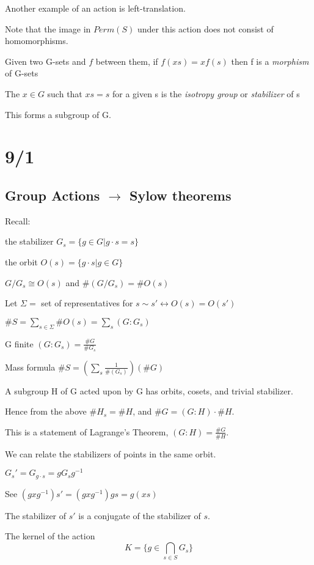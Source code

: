 \documentclass[12pt]{article}
\begin{document}
\noindent
Another example of an action is left-translation.

Note that the image in $Perm(S)$ under this action does not consist of homomorphisms.

\noindent
Given two G-sets and $f$ between them, if $f(xs) = xf(s)$ then f is a \textit{morphism} of G-sets

\noindent
The $x \in G$ such that $xs = s$ for a given s is the \textit{isotropy group} or \textit{stabilizer} of s

This forms a subgroup of G.

\newpage

\section{9/1}

\subsection{Group Actions $\to$ Sylow theorems}

Recall:

the stabilizer $G_s = \{g \in G | g \cdot s = s\}$

the orbit $O(s) = \{g \cdot s | g \in G\}$

$G\slash G_s \cong O(s)$ and $\#(G\slash G_s) = \#O(s)$

\noindent
Let $\Sigma =$ set of representatives for $s \sim s' \leftrightarrow O(s) = O(s')$

$\#S = \sum_{s \in \Sigma}\#O(s) = \sum_s(G:G_s)$

G finite $(G:G_s) = \frac{\#G}{\#G_s}$

Mass formula $\#S = (\sum_s\frac{1}{\#(G_s)})(\#G)$

\noindent
A subgroup H of G acted upon by G has orbits, cosets, and trivial stabilizer.

Hence from the above $\#H_s = \#H$, and $\#G = (G:H) \cdot \#H$.

This is a statement of Lagrange's Theorem, $(G:H) = \frac{\#G}{\#H}$.

\noindent
We can relate the stabilizers of points in the same orbit.

$G_s' = G_{g \cdot s} = gG_sg^{-1}$

See $(gxg^{-1})s' = (gxg^{-1})gs = g(xs)$ 

The stabilizer of $s'$ is a conjugate of the stabilizer of $s$.

\noindent
The kernel of the action $$K = \{g\in \bigcap_{s \in S}G_s\}$$
\end{document}
